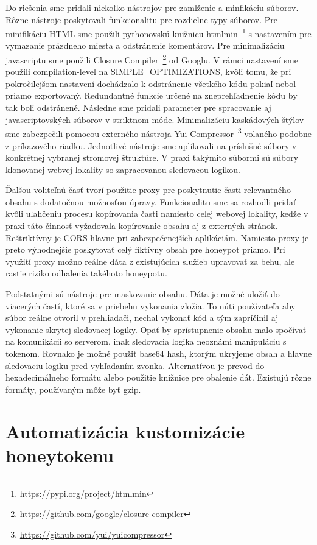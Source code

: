 \documentclass[conference, 11pt,slovak,a4paper,twoside]{IEEEtran}
\begin{document}
Do riešenia sme pridali niekoľko nástrojov pre zamlženie a minfikáciu súborov. Rôzne nástroje poskytovali funkcionalitu pre rozdielne typy súborov. Pre minifikáciu HTML sme použili pythonovskú knižnicu htmlmin~\footnote{\url{https://pypi.org/project/htmlmin}} s nastavením pre vymazanie prázdneho miesta a odstránenie komentárov. Pre minimalizáciu javascriptu sme použili Closure Compiler~\footnote{\url{https://github.com/google/closure-compiler}} od Googlu. V rámci nastavení sme použili compilation-level na SIMPLE\_OPTIMIZATIONS, kvôli tomu, že pri pokročilejšom nastavení dochádzalo k odstránenie všetkého kódu pokiaľ nebol priamo exportovaný. Redundantné funkcie určené na zneprehľadnenie kódu by tak boli odstránené. Následne sme pridali parameter pre spracovanie aj javascriptovských súborov v striktnom móde. Minimalizáciu kaskádových štýlov sme zabezpečili pomocou externého nástroja Yui Compressor~\footnote{\url{https://github.com/yui/yuicompressor}} volaného podobne z príkazového riadku. Jednotlivé nástroje sme aplikovali na príslušné súbory v konkrétnej vybranej stromovej štruktúre. V praxi takýmito súbormi sú súbory klonovanej webvej lokality so zapracovanou sledovacou logikou.

Ďalšou voliteľnú časť tvorí použitie proxy pre poskytnutie časti relevantného obsahu s dodatočnou možnosťou úpravy. Funkcionalitu sme sa rozhodli pridať kvôli uľahčeniu procesu kopírovania časti namiesto celej webovej lokality, keďže v praxi táto činnosť vyžadovala kopírovanie obsahu aj z externých stránok. Reštriktívny je CORS hlavne pri zabezpečenejších aplikáciám. Namiesto proxy je preto výhodnejšie poskytovať celý fiktívny obsah pre honeypot priamo. Pri využití proxy možno reálne dáta z existujúcich služieb upravovať za behu, ale rastie riziko odhalenia takéhoto honeypotu.

Podstatnými sú nástroje pre maskovanie obsahu. Dáta je možné uložiť do viacerých častí, ktoré sa v priebehu vykonania zložia. To núti používateľa aby súbor reálne otvoril v prehliadači, nechal vykonať kód a tým zapríčinil aj vykonanie skrytej sledovacej logiky. Opäť by sprístupnenie obsahu malo spočívať na komunikácii so serverom, inak sledovacia logika neoznámi manipuláciu s tokenom. Rovnako je možné použiť base64 hash, ktorým ukryjeme obsah a hlavne sledovaciu logiku pred vyhľadaním zvonka. Alternatívou je prevod do hexadecimálneho formátu alebo použitie knižnice pre obalenie dát. Existujú rôzne formáty, používaným môže byť gzip. 


\section{Automatizácia kustomizácie honeytokenu}
\end{document}
